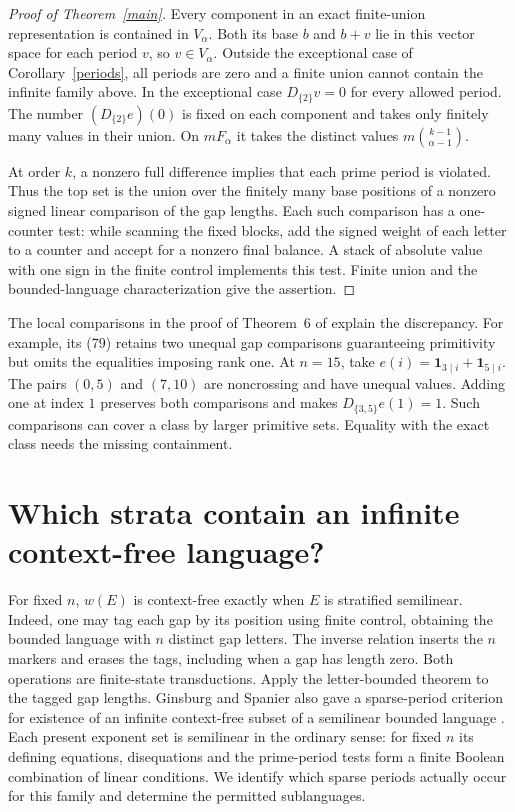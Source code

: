 \documentclass[11pt]{article}
\begin{document}
\begin{proof}[Proof of Theorem~\ref{main}]
Every component in an exact finite-union representation is contained
in \(V_\alpha\). Both its base \(b\) and \(b+v\) lie in this vector
space for each period \(v\), so \(v\in V_\alpha\).
Outside the exceptional case of Corollary~\ref{periods}, all periods
are zero and a finite union cannot contain the infinite family above.
In the exceptional case \(D_{\{2\}}v=0\) for every allowed period.
The number \((D_{\{2\}}e)(0)\) is fixed on each component and takes
only finitely many values in their union. On \(mF_\alpha\) it takes
the distinct values \(m\binom{k-1}{\alpha-1}\).

At order \(k\), a nonzero full difference implies that each prime
period is violated. Thus the top set is the union over the finitely
many base positions of a nonzero signed linear comparison of the gap
lengths. Each such comparison has a one-counter test: while scanning
the fixed blocks, add the signed weight of each letter to a counter
and accept for a nonzero final balance. A stack of absolute value
with one sign in the finite control implements this test. Finite
union and the bounded-language characterization give the assertion.
\end{proof}

The local comparisons in the proof of Theorem~6 of \cite{kasonyi}
explain the discrepancy. For example, its (79) retains two unequal
gap comparisons guaranteeing primitivity but omits the equalities
imposing rank one. At \(n=15\), take \(e(i)=\mathbf1_{3\mid i}+
\mathbf1_{5\mid i}\). The pairs \((0,5)\) and \((7,10)\) are
noncrossing and have unequal values. Adding one at index \(1\)
preserves both comparisons and makes \(D_{\{3,5\}}e(1)=1\).
Such comparisons can cover a class by larger
primitive sets. Equality with the exact class needs the missing
containment.

\section{Which strata contain an infinite context-free language?}
For fixed \(n\), \(w(E)\) is context-free exactly when \(E\) is
stratified semilinear. Indeed, one may tag each gap by its position
using finite control, obtaining the bounded language with \(n\) distinct
gap letters. The inverse relation inserts the \(n\) markers and erases
the tags, including when a gap has length zero. Both operations are
finite-state transductions. Apply the letter-bounded theorem
\cite[Theorem~2.1]{ginsburg} to the tagged gap lengths. Ginsburg and
Spanier also gave a sparse-period criterion for existence of an
infinite context-free subset of a semilinear bounded language
\cite[Theorem~2.3 and Example~(3) on p.~294]{ginsburg}.
Each present exponent set is semilinear in the ordinary sense:
for fixed \(n\) its defining equations, disequations and the
prime-period tests form a finite Boolean combination of linear
conditions. We identify which sparse periods actually occur for this
family and determine the permitted sublanguages.
\end{document}
